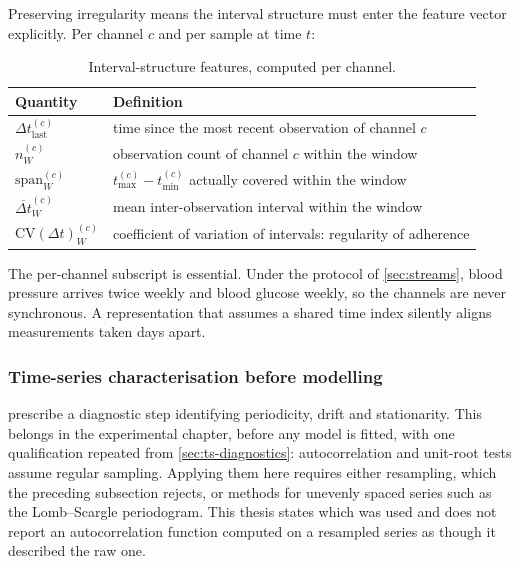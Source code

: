 \documentclass[12pt,a4paper,oneside]{report}
\begin{document}
Preserving irregularity means the interval structure must enter the feature vector explicitly. Per channel $c$ and per sample at time $t$:

\begin{table}[htbp]
\centering\small
\caption{Interval-structure features, computed per channel.}\label{tab:interval-features}
\begin{tabularx}{\textwidth}{@{}>{\raggedright\arraybackslash}p{3.4cm} X@{}}
\toprule
\textbf{Quantity} & \textbf{Definition} \\
\midrule
$\Delta t^{(c)}_{\text{last}}$ & time since the most recent observation of channel $c$ \\
$n^{(c)}_W$ & observation count of channel $c$ within the window \\
$\mathrm{span}^{(c)}_W$ & $t^{(c)}_{\max} - t^{(c)}_{\min}$ actually covered within the window \\
$\overline{\Delta t}^{(c)}_W$ & mean inter-observation interval within the window \\
$\mathrm{CV}(\Delta t)^{(c)}_W$ & coefficient of variation of intervals: regularity of adherence \\
\bottomrule
\end{tabularx}
\end{table}

The per-channel subscript is essential. Under the protocol of \cref{sec:streams}, blood pressure arrives twice weekly and blood glucose weekly, so the channels are never synchronous. A representation that assumes a shared time index silently aligns measurements taken days apart.

\subsubsection{Time-series characterisation before modelling}

\Textcite{liu2025review} prescribe a diagnostic step identifying periodicity, drift and stationarity. This belongs in the experimental chapter, before any model is fitted, with one qualification repeated from \cref{sec:ts-diagnostics}: autocorrelation and unit-root tests assume regular sampling. Applying them here requires either resampling, which the preceding subsection rejects, or methods for unevenly spaced series such as the Lomb--Scargle periodogram. This thesis states which was used and does not report an autocorrelation function computed on a resampled series as though it described the raw one.
\end{document}
